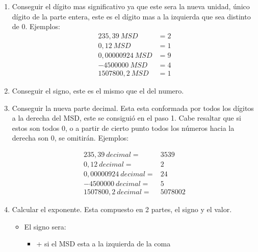     \begin{enumerate}
        \item Conseguir el dígito mas significativo ya que este sera la nueva unidad,
            único dígito de la parte entera,
            este es el dígito mas a la izquierda que sea distinto de 0. Ejemplos:
            \begin{align*}
                235,39\ MSD&= 2\\
                0,12\ MSD&=1
                \\0,00000924\ MSD&=9
                \\ -4500000\ MSD &=4\\
                1507800,2\ MSD &=1
            \end{align*}



        \item Conseguir el signo, este es el mismo que el del numero.

        \item Conseguir la nueva parte decimal. Esta esta conformada por todos
            los dígitos a la derecha del MSD, este se consiguió en el paso 1.
            Cabe resaltar que si estos son todos 0, o a partir de cierto punto todos
            los números hacia la derecha son 0, se omitirán. Ejemplos:

            \begin{align*}
                235,39\ decimal= &3539\\ 0,12\ decimal=&2\\
                  0,00000924\ decimal=&24\\ -4500000\ decimal=&5\\1507800,2\ decimal=&5078002
            \end{align*}

        \item Calcular el exponente. Esta compuesto en 2 partes, el signo y el
            valor.
            \begin{itemize}
                \item El signo sera:
                    \begin{itemize}
                        \item + si el MSD esta a la izquierda de la coma \comillas{,}


\end{itemize}
\end{itemize}
\end{enumerate}
